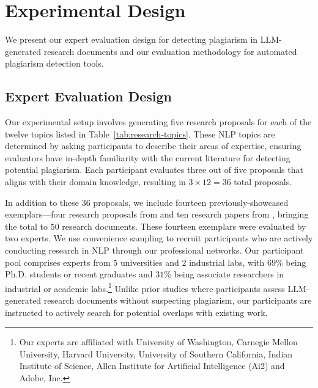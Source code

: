 \section{Experimental Design}
\label{sec:experiments}

We present our expert evaluation design for detecting plagiarism in LLM-generated research documents and our evaluation methodology for automated plagiarism detection tools.

\subsection{Expert Evaluation Design}
\label{subsec:expert-evaluation-design}

Our experimental setup involves generating 
five research proposals for each of the twelve topics listed in Table~\ref{tab:research-topics}. 
These NLP topics are determined 
by asking participants 
to describe their areas of expertise, 
ensuring evaluators have  
in-depth familiarity with 
the current literature for detecting potential plagiarism. 
Each participant evaluates three out of five proposals that aligns with their domain knowledge, resulting in $3\times12=36$ total proposals.

In addition to these $36$ proposals, 
we include fourteen previously-showcased exemplars---four research proposals from \citet{si2024can} 
and ten research papers from \citet{lu2024ai}, 
bringing the total to $50$ research documents. 
These fourteen exemplars were evaluated by two experts. 
We use convenience sampling 
to recruit participants who are actively conducting research in NLP 
through our professional networks. 
Our participant pool comprises experts from $5$ universities
and $2$ industrial labs,
with $69\%$ being Ph.D. students or recent graduates
and $31\%$ being associate researchers in industrial or academic labs.\footnote{Our experts are affiliated with University of Washington, Carnegie Mellon University, Harvard University, University of Southern California, Indian Institute of Science, Allen Institute for Artificial Intelligence (Ai2)
and Adobe, Inc.}
Unlike prior studies 
where participants assess LLM-generated research documents 
without suspecting plagiarism, 
our participants are instructed to actively search 
for potential overlaps 
with existing work.

